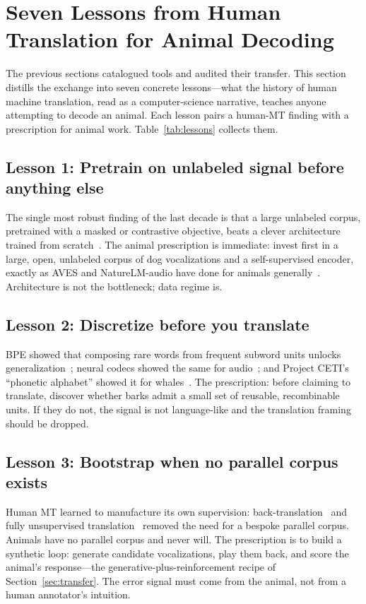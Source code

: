 \section{Seven Lessons from Human Translation for Animal Decoding}
\label{sec:lessons}

The previous sections catalogued tools and audited their transfer. This
section distills the exchange into seven concrete lessons---what the history
of human machine translation, read as a computer-science narrative, teaches
anyone attempting to decode an animal. Each lesson pairs a human-MT finding
with a prescription for animal work. Table~\ref{tab:lessons} collects them.

\subsection{Lesson 1: Pretrain on unlabeled signal before anything else}
The single most robust finding of the last decade is that a large unlabeled
corpus, pretrained with a masked or contrastive objective, beats a clever
architecture trained from scratch~\cite{devlin2019bert,baevski2020wav2vec2,liu2019roberta}.
The animal prescription is immediate: invest first in a large, open,
unlabeled corpus of dog vocalizations and a self-supervised encoder, exactly
as AVES and NatureLM-audio have done for animals
generally~\cite{hagiwara2023aves,robinson2024naturelm}. Architecture is not the
bottleneck; data regime is.

\subsection{Lesson 2: Discretize before you translate}
BPE showed that composing rare words from frequent subword units unlocks
generalization~\cite{sennrich2016bpe}; neural codecs showed the same for
audio~\cite{zeghidour2021soundstream,defossez2022encodec}; and Project CETI's
``phonetic alphabet'' showed it for whales~\cite{sharma2024whale}. The
prescription: before claiming to translate, discover whether barks admit a
small set of reusable, recombinable units. If they do not, the signal is not
language-like and the translation framing should be dropped.

\subsection{Lesson 3: Bootstrap when no parallel corpus exists}
Human MT learned to manufacture its own supervision:
back-translation~\cite{sennrich2016improving,edunov2018backtrans} and fully
unsupervised translation~\cite{artetxe2018unsupervised,lample2018unsupervised}
removed the need for a bespoke parallel corpus. Animals have no parallel
corpus and never will. The prescription is to build a synthetic loop:
generate candidate vocalizations, play them back, and score the animal's
response---the generative-plus-reinforcement recipe of
Section~\ref{sec:transfer}. The error signal must come from the animal, not
from a human annotator's intuition.

